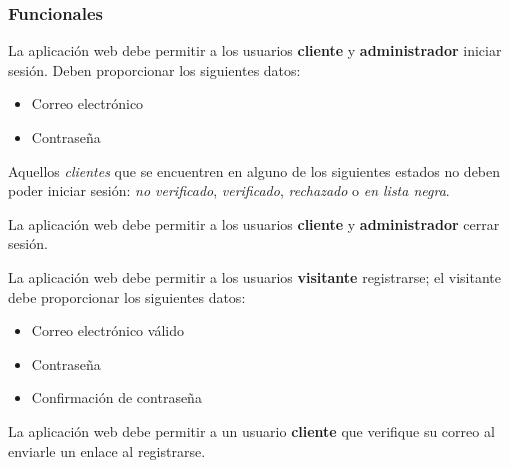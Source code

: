 %
%

\subsubsection{Funcionales}


{
  La aplicación web debe permitir a los usuarios \textbf{cliente} y
  \textbf{administrador} iniciar sesión. Deben proporcionar los siguientes
  datos:
  \begin{itemize}
    \item Correo electrónico
    \item Contraseña
  \end{itemize}


  \begin{hangparas}{2em}{0}
    {
      Aquellos \textit{clientes} que se encuentren en alguno de los siguientes
      estados no deben poder iniciar sesión: \textit{no verificado},
      \textit{verificado}, \textit{rechazado} o \textit{en lista negra}.
    }
  \end{hangparas}
}

{
  La aplicación web debe permitir a los usuarios \textbf{cliente} y
  \textbf{administrador} cerrar sesión.
}

{
  La aplicación web debe permitir a los usuarios \textbf{visitante}
  registrarse; el visitante debe proporcionar los siguientes datos:
  \begin{itemize}
    \item Correo electrónico válido
    \item Contraseña
    \item Confirmación de contraseña
  \end{itemize}
}

{
  La aplicación web debe permitir a un usuario \textbf{cliente} que verifique
  su correo al enviarle un enlace al registrarse.
}

